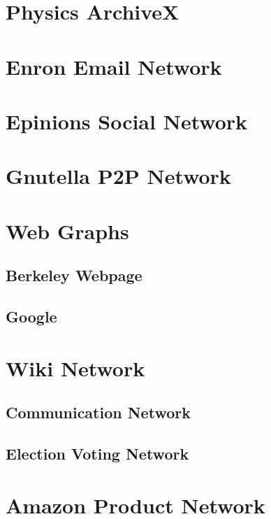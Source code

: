 \documentclass[phd,tocprelim]{cornell}
\begin{document}
\section{Physics ArchiveX}



\section{Enron Email Network}

\section{Epinions Social Network}

\section{Gnutella P2P Network}

\section{Web Graphs}

\subsection{Berkeley Webpage}

\subsection{Google}


\section{Wiki Network}

\subsection{Communication Network}

\subsection{Election Voting Network}



\section{Amazon Product Network}
\end{document}
